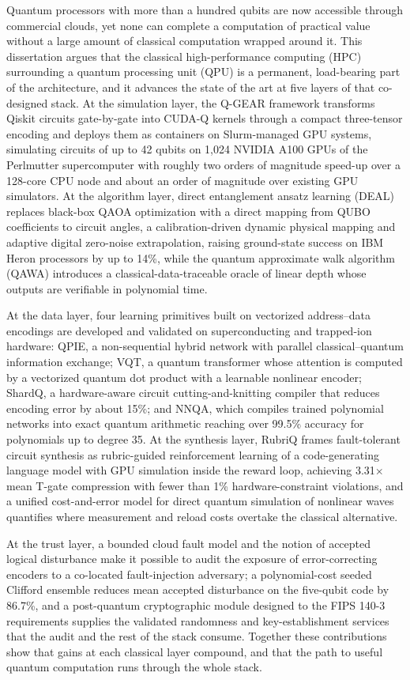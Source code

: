 \begin{ttuabstract}
Quantum processors with more than a hundred qubits are now accessible through commercial clouds, yet none can complete a computation of practical value without a large amount of classical computation wrapped around it. This dissertation argues that the classical high-performance computing (HPC) surrounding a quantum processing unit (QPU) is a permanent, load-bearing part of the architecture, and it advances the state of the art at five layers of that co-designed stack. At the simulation layer, the Q-GEAR framework transforms Qiskit circuits gate-by-gate into CUDA-Q kernels through a compact three-tensor encoding and deploys them as containers on Slurm-managed GPU systems, simulating circuits of up to 42 qubits on 1,024 NVIDIA A100 GPUs of the Perlmutter supercomputer with roughly two orders of magnitude speed-up over a 128-core CPU node and about an order of magnitude over existing GPU simulators. At the algorithm layer, direct entanglement ansatz learning (DEAL) replaces black-box QAOA optimization with a direct mapping from QUBO coefficients to circuit angles, a calibration-driven dynamic physical mapping and adaptive digital zero-noise extrapolation, raising ground-state success on IBM Heron processors by up to 14\%, while the quantum approximate walk algorithm (QAWA) introduces a classical-data-traceable oracle of linear depth whose outputs are verifiable in polynomial time.

At the data layer, four learning primitives built on vectorized address--data encodings are developed and validated on superconducting and trapped-ion hardware: QPIE, a non-sequential hybrid network with parallel classical--quantum information exchange; VQT, a quantum transformer whose attention is computed by a vectorized quantum dot product with a learnable nonlinear encoder; ShardQ, a hardware-aware circuit cutting-and-knitting compiler that reduces encoding error by about 15\%; and NNQA, which compiles trained polynomial networks into exact quantum arithmetic reaching over 99.5\% accuracy for polynomials up to degree 35. At the synthesis layer, RubriQ frames fault-tolerant circuit synthesis as rubric-guided reinforcement learning of a code-generating language model with GPU simulation inside the reward loop, achieving 3.31$\times$ mean T-gate compression with fewer than 1\% hardware-constraint violations, and a unified cost-and-error model for direct quantum simulation of nonlinear waves quantifies where measurement and reload costs overtake the classical alternative.

At the trust layer, a bounded cloud fault model and the notion of accepted logical disturbance make it possible to audit the exposure of error-correcting encoders to a co-located fault-injection adversary; a polynomial-cost seeded Clifford ensemble reduces mean accepted disturbance on the five-qubit code by 86.7\%, and a post-quantum cryptographic module designed to the FIPS 140-3 requirements supplies the validated randomness and key-establishment services that the audit and the rest of the stack consume. Together these contributions show that gains at each classical layer compound, and that the path to useful quantum computation runs through the whole stack.
\end{ttuabstract}
